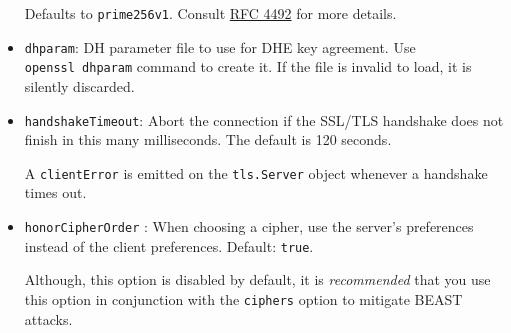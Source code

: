 \begin{itemize}
  Defaults to \texttt{prime256v1}. Consult
  \href{http://www.rfc-editor.org/rfc/rfc4492.txt}{RFC 4492} for more
  details.
\item
  \texttt{dhparam}: DH parameter file to use for DHE key agreement. Use
  \texttt{openssl\ dhparam} command to create it. If the file is invalid
  to load, it is silently discarded.
\item
  \texttt{handshakeTimeout}: Abort the connection if the SSL/TLS
  handshake does not finish in this many milliseconds. The default is
  120 seconds.

  A \texttt{\textquotesingle{}clientError\textquotesingle{}} is emitted
  on the \texttt{tls.Server} object whenever a handshake times out.
\item
  \texttt{honorCipherOrder} : When choosing a cipher, use the server's
  preferences instead of the client preferences. Default: \texttt{true}.

  Although, this option is disabled by default, it is \emph{recommended}
  that you use this option in conjunction with the \texttt{ciphers}
  option to mitigate BEAST attacks.


\end{itemize}
